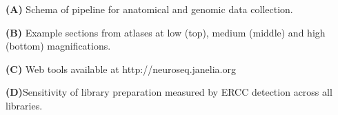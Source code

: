 \textbf{(A)} Schema of pipeline for anatomical and genomic data collection.

\textbf{(B)} Example sections from atlases at low (top), medium (middle) and high (bottom) magnifications.

\textbf{(C)} Web tools available at http://neuroseq.janelia.org

\textbf{(D)}Sensitivity of library preparation measured by ERCC detection across all libraries.
